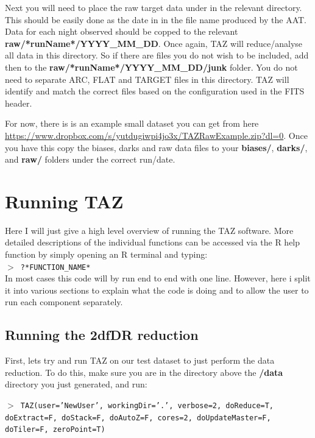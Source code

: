 \documentclass[12pt]{article}
\begin{document}
Next you will need to place the raw target data under in the relevant directory. This should be easily done as the date in in the file name produced by the AAT. Data for each night observed should be copped to the relevant \textbf{raw/*runName*/YYYY\_MM\_DD}. Once again, TAZ will reduce/analyse all data in this directory. So if there are files you do not wish to be included, add then to the \textbf{raw/*runName*/YYYY\_MM\_DD/junk} folder. You do not need to separate ARC, FLAT and TARGET files in this directory. TAZ will identify and match the correct files based on the configuration used in the FITS header.  

For now, there is is an example small dataset you can get from here \url{https://www.dropbox.com/s/yutdugiwpi4jo3x/TAZRawExample.zip?dl=0}. Once you have this copy the biases, darks and raw data files to your \textbf{biases/}, \textbf{darks/}, and \textbf{raw/} folders under the correct run/date.  

\section{Running TAZ}

Here I will just give a high level overview of running the TAZ software. More detailed descriptions of the individual functions can be accessed via the R help function by simply opening an R terminal and typing: \\

\hspace{10mm}  \texttt{$>$ ?*FUNCTION\_NAME*}\\

In most cases this code will by run end to end with one line. However, here i split it into various sections to explain what the code is doing and to allow the user to run each component separately. 

\subsection{Running the 2dfDR reduction}

First, lets try and run TAZ on our test dataset to just perform the data reduction. To do this, make sure you are in the directory above the \textbf{/data} directory you just generated, and run:

\hspace{10mm} \texttt{$>$ TAZ(user='NewUser', workingDir='.', verbose=2, doReduce=T, doExtract=F, doStack=F, doAutoZ=F, cores=2, doUpdateMaster=F, doTiler=F, zeroPoint=T)}
\end{document}
